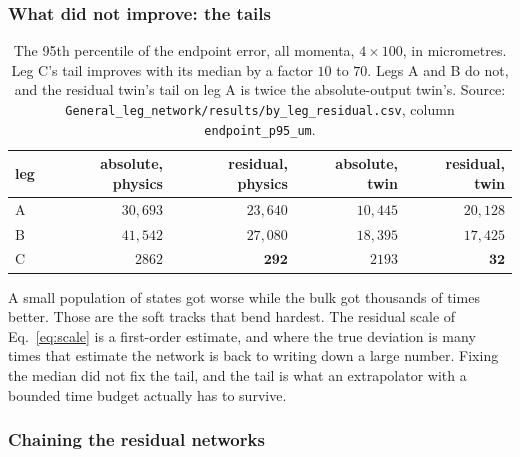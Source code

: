 \documentclass[11pt,a4paper]{article}
\begin{document}
\subsubsection{What did not improve: the tails}
\label{sec:tails}

\begin{table}[tbp]
  \centering
  \caption{The 95th percentile of the endpoint error, all momenta,
  $4 \times 100$, in micrometres. Leg C's tail improves with its median by a
  factor $10$ to $70$. Legs A and B do not, and the residual twin's tail on leg
  A is twice the absolute-output twin's. Source:
  \texttt{General\_leg\_network/results/by\_leg\_residual.csv}, column
  \texttt{endpoint\_p95\_um}.}
  \label{tab:tails}
  \small
  \begin{tabular}{lrrrr}
    \toprule
    leg & absolute, physics & residual, physics & absolute, twin & residual, twin \\
    \midrule
    A & $30{,}693$ & $23{,}640$ & $10{,}445$ & $20{,}128$ \\
    B & $41{,}542$ & $27{,}080$ & $18{,}395$ & $17{,}425$ \\
    C & $2862$     & $\mathbf{292}$ & $2193$ & $\mathbf{32}$ \\
    \bottomrule
  \end{tabular}
\end{table}

A small population of states got worse while the bulk got thousands of times
better. Those are the soft tracks that bend hardest. The residual scale of
Eq.~\eqref{eq:scale} is a first-order estimate, and where the true deviation is
many times that estimate the network is back to writing down a large number.
Fixing the median did not fix the tail, and the tail is what an extrapolator
with a bounded time budget actually has to survive.

\subsubsection{Chaining the residual networks}
\end{document}
